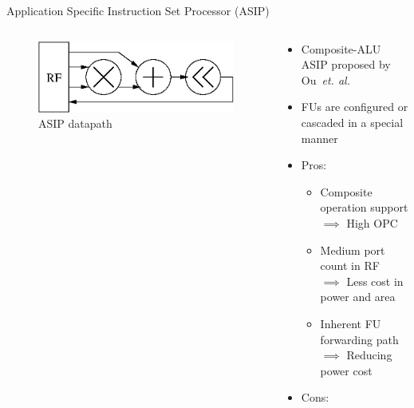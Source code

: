 \documentclass{beamer}
\begin{document}
\begin{CJK}{UTF8}{bkai}
            \begin{frame}{Application Specific Instruction Set Processor (ASIP)}
                \begin{columns}
                    \begin{column}{0.45\textwidth}
                        \begin{figure}[!ht]
                            \centering
                            \includegraphics[width=0.9\linewidth]{./figs/cascade.eps}
                            \caption{ASIP datapath}
                        \end{figure}
                    \end{column}
                    \begin{column}{0.55\textwidth}
                        \begin{itemize}
                            \item <2-> {Composite-ALU ASIP proposed by Ou~\textit{et. al.}\footnotemark}
                            \item <3-> {FUs are configured or cascaded in a special manner}
                            \item <4-> {Pros:
                                \begin{itemize}
                                    \item Composite operation support \\ $\implies$ High OPC
                                    \item Medium port count in RF \\ $\implies$ Less cost in power and area
                                    \item Inherent FU forwarding path \\ $\implies$ Reducing power cost
                                \end{itemize}
                                }
                            \item <5-> {Cons:
                                \begin{itemize}

\end{itemize}}
\end{itemize}
\end{column}
\end{columns}
\end{frame}
\end{CJK}
\end{document}
